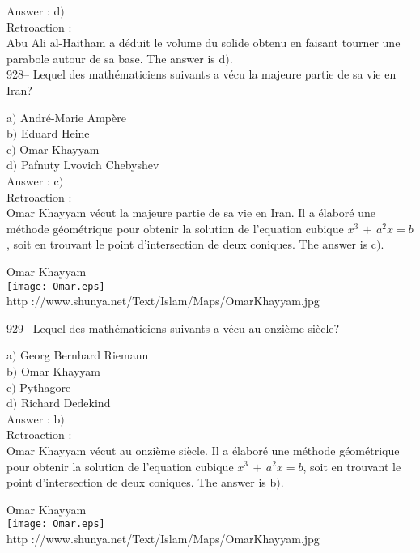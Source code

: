 ﻿\documentclass[letterpaper, 12pt]{article}
\begin{document}
Answer : d$)$\\

Retroaction : \\
Abu Ali al-Haitham a d\'eduit le volume du solide obtenu en faisant tourner
une parabole autour de sa base. The answer is d$)$.\\

928-- Lequel des math\'ematiciens suivants a v\'ecu la majeure
partie de sa vie en Iran?

a$)$ Andr\'e-Marie Amp\`ere \\
b$)$ Eduard Heine \\
c$)$ Omar Khayyam \\
d$)$ Pafnuty Lvovich Chebyshev\\

Answer : c$)$\\

Retroaction : \\
Omar Khayyam v\'ecut la majeure partie de sa vie en Iran. Il a
\'elabor\'e une m\'ethode g\'eom\'etrique pour obtenir la solution
de l'equation cubique $x^3\,+\,a^2x=b$,
soit en trouvant le point d'intersection de deux coniques. The answer is
c$)$.\\

        \begin{center}
        Omar Khayyam\\
    \texttt{[image: Omar.eps]}\\
        {\footnotesize http
://www.shunya.net/Text/Islam/Maps/OmarKhayyam.jpg}
    \end{center}

929-- Lequel des math\'ematiciens suivants a v\'ecu au onzi\`eme
si\`ecle?

a$)$ Georg Bernhard Riemann \\
b$)$ Omar Khayyam \\
c$)$ Pythagore \\
d$)$ Richard Dedekind\\

Answer : b$)$\\

Retroaction :\\
Omar Khayyam v\'ecut au onzi\`eme si\`ecle. Il a \'elabor\'e une
m\'ethode g\'eom\'etrique pour obtenir
la solution de l'equation cubique $x^3\,+\,a^2x=b$, soit en trouvant le
point d'intersection de deux coniques. The answer is b$)$.\\

        \begin{center}
        Omar Khayyam\\
    \texttt{[image: Omar.eps]}\\
        {\footnotesize http
://www.shunya.net/Text/Islam/Maps/OmarKhayyam.jpg}
    \end{center}
\end{document}
